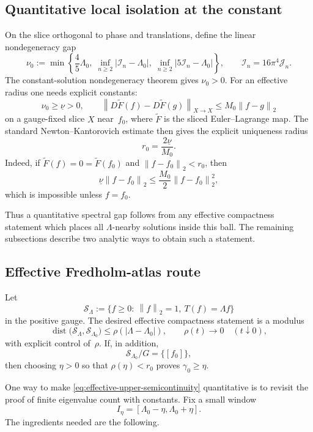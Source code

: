 \documentclass[12pt]{article}
\theoremstyle{definition}
\theoremstyle{remark}
\newcommand{\abs}[1]{\left|#1\right|}
\newcommand{\norm}[1]{\left\|#1\right\|}
\begin{document}
\subsection{Quantitative local isolation at the constant}

On the slice orthogonal to phase and translations, define the linear
nondegeneracy gap
\[
  \nu_0:=
  \min\left\{
    \frac45\Lambda_0,\;
    \inf_{n\geq2}\abs{\mathcal I_n-\Lambda_0},\;
    \inf_{n\geq2}\abs{5\mathcal I_n-\Lambda_0}
  \right\},
  \qquad
  \mathcal I_n=16\pi^4\mathcal J_n.
\]
The constant-solution nondegeneracy theorem gives $\nu_0>0$.  For an
effective radius one needs explicit constants:
\[
  \nu_0\geq\underline\nu>0,
  \qquad
  \norm{D\widetilde F(f)-D\widetilde F(g)}_{X\to X}
  \leq M_0\norm{f-g}_2
\]
on a gauge-fixed slice $X$ near~$f_0$, where
$\widetilde F$ is the sliced Euler--Lagrange map.  The standard
Newton--Kantorovich estimate then gives the explicit uniqueness radius
\begin{equation}\label{eq:nk-radius}
  r_0=\frac{2\underline\nu}{M_0}.
\end{equation}
Indeed, if $\widetilde F(f)=0=\widetilde F(f_0)$ and
$\norm{f-f_0}_2<r_0$, then
\[
  \underline\nu\norm{f-f_0}_2
  \leq
  \frac{M_0}{2}\norm{f-f_0}_2^2,
\]
which is impossible unless $f=f_0$.

Thus a quantitative spectral gap follows from any effective compactness
statement which places all $\Lambda$-nearby solutions inside this ball.
The remaining subsections describe two analytic ways to obtain such a
statement.

\subsection{Effective Fredholm-atlas route}
\label{sec:effective-fredholm-atlas}

Let
\[
  \mathcal S_\Lambda
  :=
  \{f\geq0:\ \norm f_2=1,\ T(f)=\Lambda f\}
\]
in the positive gauge.  The desired effective compactness statement is a
modulus
\begin{equation}\label{eq:effective-upper-semicontinuity}
  \operatorname{dist}\bigl(\mathcal S_\Lambda,\mathcal S_{\Lambda_0}\bigr)
  \leq \rho(\abs{\Lambda-\Lambda_0}),
  \qquad \rho(t)\to0\quad(t\downarrow0),
\end{equation}
with explicit control of~$\rho$.  If, in addition,
\[
  \mathcal S_{\Lambda_0}/G=\{[f_0]\},
\]
then choosing $\eta>0$ so that $\rho(\eta)<r_0$ proves
$\gamma_0\geq\eta$.

One way to make \eqref{eq:effective-upper-semicontinuity} quantitative is
to revisit the proof of finite eigenvalue count with constants.  Fix a
small window
\[
  I_\eta=[\Lambda_0-\eta,\Lambda_0+\eta].
\]
The ingredients needed are the following.
\end{document}
